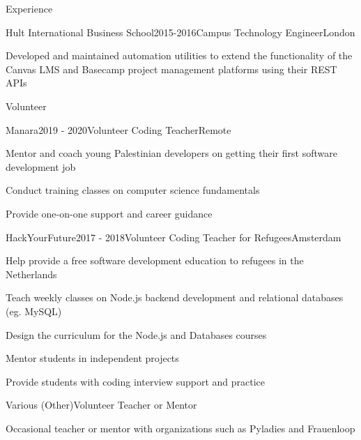 \documentclass{resume} %
\begin{document}
\begin{rSection}{Experience}
\begin{rSubsection}{{Hult International Business School}}{2015-2016}{Campus Technology Engineer}{London}
    \item Developed and maintained automation utilities to extend the functionality of the Canvas LMS and Basecamp project management platforms using their REST APIs
\end{rSubsection}

\end{rSection}

\newpage


\begin{rSection}{Volunteer}

    \begin{rSubsection}{{Manara}}{2019 - 2020}{Volunteer Coding Teacher}{Remote}
        \item Mentor and coach young Palestinian developers on getting their first software development job
        \item Conduct training classes on computer science fundamentals
        \item Provide one-on-one support and career guidance
    \end{rSubsection}


    \begin{rSubsection}{{HackYourFuture}}{2017 - 2018}{Volunteer Coding Teacher for Refugees}{Amsterdam}
        \item Help provide a free software development education to refugees in the Netherlands
        \item Teach weekly classes on Node.js backend development and relational databases (eg. MySQL)
        \item Design the curriculum for the Node.js and Databases courses
        \item Mentor students in independent projects
        \item Provide students with coding interview support and practice
    \end{rSubsection}

    \begin{rSubsection}{{Various (Other)}}{}{Volunteer Teacher or Mentor}{}
        \item Occasional teacher or mentor with organizations such as Pyladies and Frauenloop
    \end{rSubsection}


\end{rSection}
\end{document}
